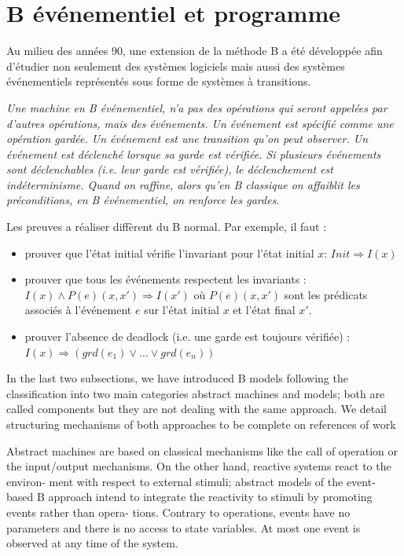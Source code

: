 \documentclass[10pt,a4paper]{article}
\begin{document}
{\section{B événementiel et programme}

Au milieu des années 90, une extension de la méthode B a été développée afin d'étudier non seulement des systèmes logiciels mais aussi des systèmes événementiels représentés sous forme de systèmes à transitions.

\emph{Une machine en B  événementiel, n'a pas des opérations qui seront appelées par d'autres opérations, mais des  événements. Un  événement est spécifié comme une opération gardée. Un événement  est une transition qu'on peut observer.\newline
\indent Un  événement est déclenché lorsque sa garde est vérifiée. Si plusieurs événements sont déclenchables (i.e. leur garde est vérifiée), le déclenchement est indéterminisme. \newline
\indent Quand on raffine, alors qu'en B classique on affaiblit les préconditions, en B événementiel, on renforce les gardes.}\cite{habrias2006specifications}

Les preuves a réaliser diffèrent du B \og normal\fg. Par exemple, il faut :
\begin{itemize}
\item prouver que l'état initial vérifie l'invariant pour l'état initial $x$: $ Init \Rightarrow I(x)$
\item prouver que tous les événements respectent les invariants : $ I(x) \wedge P(e)(x, x') \Rightarrow I(x')$ où $P(e)(x, x')$ sont les prédicats associés à l'événement $e$ sur l'état initial $x$ et l'état final $x'$.
\item prouver l'absence de deadlock (i.e. une garde est toujours vérifiée) : $ I(x) \Rightarrow \left( grd(e_1) \vee \ldots \vee grd(e_n) \right)$
\end{itemize}

\iffalse
In the last two subsections, we have introduced B models following the classification
into two main categories abstract machines and models; both are called components
but they are not dealing with the same approach. We detail structuring mechanisms
of both approaches to be complete on references of work 

Abstract machines are based on classical mechanisms like the call of operation or the
input/output mechanisms. On the other hand, reactive systems react to the environ-
ment with respect to external stimuli; abstract models of the event-based B approach
intend to integrate the reactivity to stimuli by promoting events rather than opera-
tions.
Contrary to operations, events have no parameters and there is no access to
state variables. At most one event is observed at any time of the system.

}
\end{document}
